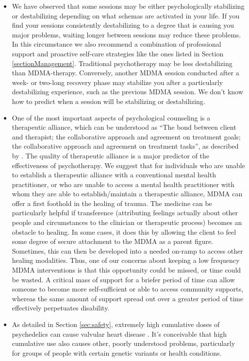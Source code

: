 \documentclass[12pt,letterpaper]{book}
\begin{document}
\begin{itemize}
    \item We have observed that some sessions may be either psychologically stabilizing or destabilizing depending on what schemas are activated in your life. If you find your sessions consistently destabilizing to a degree that is causing you major problems, waiting longer between sessions may reduce these problems. In this circumstance we also recommend a combination of professional support and proactive self-care strategies like the ones listed in Section \ref{sectionManagement}. Traditional psychotherapy may be less destabilizing than MDMA-therapy. Conversely, another MDMA session conducted after a week- or two-long recovery phase may stabilize you after a particularly destabilizing experience, such as the previous MDMA session. We don't know how to predict when a session will be stabilizing or destabilizing.
    \item One of the most important aspects of psychological counseling is a therapeutic alliance, which can be understood as “The bond between client and therapist; the collaborative approach and agreement on treatment goals; the collaborative approach and agreement on treatment tasks”, as described by \textcite{BRWAIdownload}. The quality of therapeutic alliance is a major predictor of the effectiveness of psychotherapy. We suggest that for individuals who are unable to establish a therapeutic alliance with a conventional mental health practitioner, or who are unable to access a mental health practitioner with whom they are able to establish/maintain a therapeutic alliance, MDMA can offer a first foothold in the healing of trauma. The medicine can be particularly helpful if transference (attributing feelings actually about other people and circumstances to the clinician or therapeutic process) becomes an obstacle to healing. In some cases, it does this by allowing the client to feel some degree of secure attachment to the MDMA as a parent figure. Sometimes, this can then be developed into a needed on-ramp to access other healing modalities. Thus, one of our concerns about keeping a low frequency MDMA interventions is that this opportunity could be missed, or time could be wasted. A critical mass of support for a briefer period of time can allow someone to become more self-sufficient or able to access community supports, whereas the same amount of support spread out over a greater period of time effectively perpetuates disability.
    \item As detailed in Section \ref{sec:safety}, extremely high cumulative doses of psychedelics can cause valvular heart disease \cite{droogmans2007valvular,tagen2023valvular}. It's conceivable that high cumulative use also causes other, poorly understood problems, particularly for groups of people with certain genetic variants or health conditions.
\end{itemize}
\end{document}
